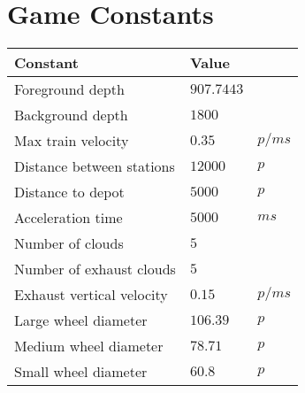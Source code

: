 \chapter{Game Constants}\label{app:constants}

\begin{center}
\begin{tabular}{| l | l l |}
\hline
\textbf{Constant} & \textbf{Value} & \\
\hline
Foreground depth & $907.7443$ &\\
Background depth & $1800$ &\\
Max train velocity & $0.35$ & $p/ms$\\
Distance between stations & $12000$ & $p$\\
Distance to depot & $5000$ & $p$\\
Acceleration time & $5000$ & $ms$\\
Number of clouds & $5$ &\\
Number of exhaust clouds & $5$ &\\
Exhaust vertical velocity & $0.15$ & $p/ms$\\
Large wheel diameter & $106.39$ & $p$\\
Medium wheel diameter & $78.71$ & $p$\\
Small wheel diameter & $60.8$ & $p$\\
\hline
\end{tabular}
\end{center}
